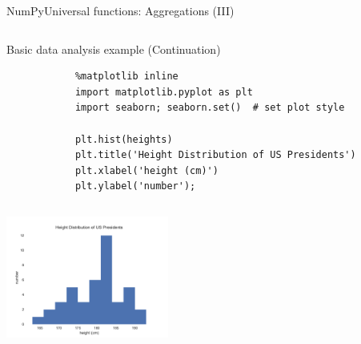 \documentclass[10pt,compress]{beamer} %
\begin{document}
\begin{frame}[fragile]{NumPy}{Universal functions: Aggregations (III)}
	\vspace{-0.2cm} 
	\begin{columns}
		\begin{exampleblock}{\footnotesize{Basic data analysis example (Continuation)}}
		\vspace{-0.2cm} 
			\begin{lstlisting}
			%matplotlib inline
			import matplotlib.pyplot as plt
			import seaborn; seaborn.set()  # set plot style

			plt.hist(heights)
			plt.title('Height Distribution of US Presidents')
			plt.xlabel('height (cm)')
			plt.ylabel('number');
			\end{lstlisting}
		\vspace{-0.2cm} 
		\end{exampleblock}
	\end{columns}

	\centering \includegraphics[width=0.4\textwidth]{figs/presidents.pdf}	
\end{frame}
\end{document}
